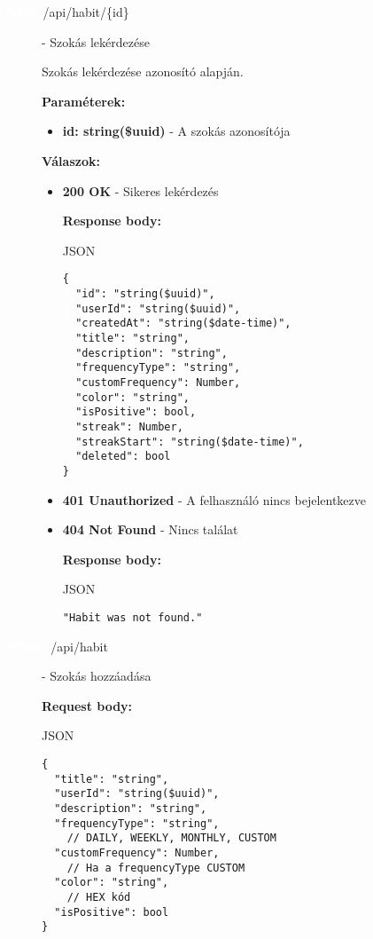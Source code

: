 \documentclass[12pt]{report}
\newcommand{\httpGet}[1]{\colorbox{getColor}{\textbf{\textcolor{white}{GET}}}~#1}
\newcommand{\httpPost}[1]{\colorbox{postColor}{\textbf{\textcolor{white}{POST}}}~#1}
\begin{document}
\begin{description}
  \item[\httpGet{/api/habit/\{id\}}] - Szokás lekérdezése
  
  \vspace{0.5cm}
  Szokás lekérdezése azonosító alapján.

  \vspace{0.5cm}
  \textbf{Paraméterek:}
  \begin{itemize}
    \item \textbf{id: string(\$uuid)} - A szokás azonosítója
  \end{itemize}

  \vspace{0.5cm}
  \textbf{Válaszok:}
  \begin{itemize}
    \item \textbf{200 OK} - Sikeres lekérdezés

      \textbf{Response body:}
      \begin{codeblock}{JSON}
        \begin{verbatim}
{
  "id": "string($uuid)",
  "userId": "string($uuid)",
  "createdAt": "string($date-time)",
  "title": "string",
  "description": "string",
  "frequencyType": "string",
  "customFrequency": Number,
  "color": "string",
  "isPositive": bool,
  "streak": Number,
  "streakStart": "string($date-time)",
  "deleted": bool
}
        \end{verbatim}
      \end{codeblock}

    \item \textbf{401 Unauthorized} - A felhasználó nincs bejelentkezve

    \item \textbf{404 Not Found} - Nincs találat

      \textbf{Response body:}
      \begin{codeblock}{JSON}
        \begin{verbatim}
"Habit was not found."
        \end{verbatim}
      \end{codeblock}
  \end{itemize}

  \item[\httpPost{/api/habit}] - Szokás hozzáadása
  
    \vspace{0.5cm}
    \textbf{Request body:}
    \begin{codeblock}{JSON}
      \begin{verbatim}
{
  "title": "string",
  "userId": "string($uuid)",
  "description": "string",
  "frequencyType": "string",
    // DAILY, WEEKLY, MONTHLY, CUSTOM
  "customFrequency": Number,
    // Ha a frequencyType CUSTOM
  "color": "string",
    // HEX kód
  "isPositive": bool
}
      \end{verbatim}
    \end{codeblock}


\end{description}
\end{document}

